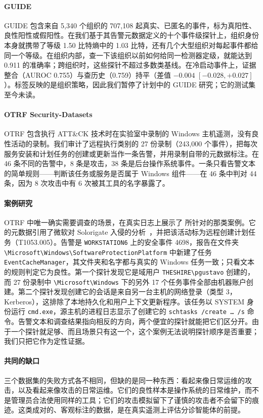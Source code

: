 \paragraph{GUIDE~\citep{guide}} GUIDE 包含来自 5{,}340 个组织的 707{,}108 起真实、已匿名的事件，标为真阳性、良性阳性或假阳性。在我们基于其告警元数据定义的十个事件级探针上，组织身份本身就携带了等级 1.50 比特熵中的 1.03 比特，还有几个大型组织对每起事件都给同一个等级。在组织内部，查一下该组织以前如何给同一检测器定级，就能达到 0.911 的准确率；跨组织时，这些探针不超过多数类基线。在冷启动事件上，证据整合（AUROC 0.755）与查历史（0.759）持平（差值 $-0.004$ $[-0.028,+0.027]$）。标签反映的是组织策略，因此我们暂停了计划中的 GUIDE 研究；它的测试集至今未读。

\paragraph{OTRF Security-Datasets~\citep{otrf}} OTRF 包含执行 ATT\&CK 技术时在实验室中录制的 Windows 主机遥测，没有良性活动的录制。我们审计了远程执行类别的 27 份录制（243{,}000 个事件），把每次服务安装和计划任务的创建或更新当作一条告警，并用录制自带的元数据标注。在 46 条不同的告警中，8 条是攻击，38 条是后台操作系统事件。一条只看告警文本的简单规则——判断该任务或服务是否属于 Windows 组件——在 46 条中判对 44 条，因为 8 次攻击中有 6 次被其工具的名字暴露了。

\paragraph{案例研究} OTRF 中唯一确实需要调查的场景，在真实日志上展示了 \hesp{} 所针对的那类案例。它的元数据引用了微软对 Solorigate 入侵的分析~\citep{solorigate}，并把该活动标为远程创建计划任务（T1053.005）。告警是 \texttt{WORKSTATION6} 上的安全事件 4698，报告在文件夹 \texttt{\textbackslash Microsoft\textbackslash Windows\textbackslash Software\-Protection\-Platform} 中新建了任务 \texttt{EventCacheManager}，其文件夹和名字都与真实的 Windows 任务一致；只看文本的规则判定它为良性。第一个探针发现它是域用户 \texttt{THESHIRE\textbackslash pgustavo} 创建的，而 27 份录制中 \texttt{\textbackslash Microsoft\textbackslash Windows} 下的另外 17 个任务事件全部由机器账户创建。第二个探针发现创建它的会话是来自另一台主机的网络登录（类型 3，Kerberos），这排除了本地持久化和用户上下文更新程序。该任务以 SYSTEM 身份运行 \texttt{cmd.exe}，源主机的进程日志显示了创建它的 \texttt{schtasks /create \dots{} /s} 命令。告警文本和调查结果指向相反的方向，两个便宜的探针就能把它们区分开。由于一个探针就足够、而且场景只有这一个，这个案例无法说明探针顺序是否重要；我们只把它作为定性证据。

\paragraph{共同的缺口} 三个数据集的失败方式各不相同，但缺的是同一种东西：看起来像日常运维的攻击，以及看起来像攻击的日常运维。它们的良性样本是操作系统的日常维护，而不是管理员合法使用同样的工具；它们的攻击模拟留下了谨慎的攻击者不会留下的痕迹。这类成对的、客观标注的数据，是在真实遥测上评估分诊智能体的前提。

